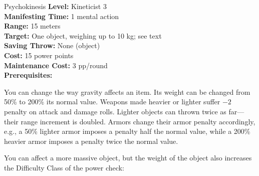 {Psychokinesis}
{
	\textbf{Level:}
	Kineticist 3\\
	\textbf{Manifesting Time:}
	1 mental action\\
	\textbf{Range:}
	15 meters\\
	\textbf{Target:}
	One object, weighing up to 10 kg; see text\\
	\textbf{Saving Throw:}
	None (object)\\
	\textbf{Cost:}
	15 power points\\
	\textbf{Maintenance Cost:}
	3 pp/round\\
	\textbf{Prerequisites:}
	\\
}
{
	You can change the way gravity affects an item. Its weight can be changed from 50\% to 200\% its normal value. Weapons made heavier or lighter suffer $-2$ penalty on attack and damage rolls. Lighter objects can thrown twice as far---their range increment is doubled. Armors change their armor penalty accordingly, e.g., a 50\% lighter armor imposes a penalty half the normal value, while a 200\% heavier armor imposes a penalty twice the normal value.

	You can affect a more massive object, but the weight of the object also increases the Difficulty Class of the power check:

}
